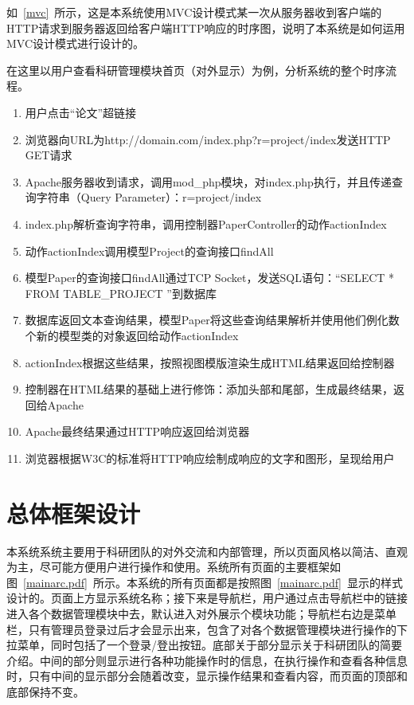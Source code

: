 如~\ref{mvc}~所示，这是本系统使用MVC设计模式某一次从服务器收到客户端的HTTP请求到服务器返回给客户端HTTP响应的时序图，说明了本系统是如何运用MVC设计模式进行设计的。

在这里以用户查看科研管理模块首页（对外显示）为例，分析系统的整个时序流程。
\begin{enumerate}
\item 用户点击“论文”超链接
\item 浏览器向URL为http://domain.com/index.php?r=project/index发送HTTP GET请求
\item Apache服务器收到请求，调用mod\_php模块，对index.php执行，并且传递查询字符串（Query Parameter）：r=project/index
\item index.php解析查询字符串，调用控制器PaperController的动作actionIndex
\item 动作actionIndex调用模型Project的查询接口findAll
\item 模型Paper的查询接口findAll通过TCP Socket，发送SQL语句：“SELECT * FROM TABLE\_PROJECT ”到数据库
\item 数据库返回文本查询结果，模型Paper将这些查询结果解析并使用他们例化数个新的模型类的对象返回给动作actionIndex
\item actionIndex根据这些结果，按照视图模版渲染生成HTML结果返回给控制器
\item 控制器在HTML结果的基础上进行修饰：添加头部和尾部，生成最终结果，返回给Apache
\item Apache最终结果通过HTTP响应返回给浏览器
\item 浏览器根据W3C的标准将HTTP响应绘制成响应的文字和图形，呈现给用户 
\end{enumerate}

\section{总体框架设计}

本系统系统主要用于科研团队的对外交流和内部管理，所以页面风格以简洁、直观为主，尽可能方便用户进行操作和使用。系统所有页面的主要框架如图~\ref{mainarc.pdf}~所示。本系统的所有页面都是按照图~\ref{mainarc.pdf}~显示的样式设计的。页面上方显示系统名称；接下来是导航栏，用户通过点击导航栏中的链接进入各个数据管理模块中去，默认进入对外展示个模块功能；导航栏右边是菜单栏，只有管理员登录过后才会显示出来，包含了对各个数据管理模块进行操作的下拉菜单，同时包括了一个登录/登出按钮。底部关于部分显示关于科研团队的简要介绍。中间的部分则显示进行各种功能操作时的信息，在执行操作和查看各种信息时，只有中间的显示部分会随着改变，显示操作结果和查看内容，而页面的顶部和底部保持不变。

